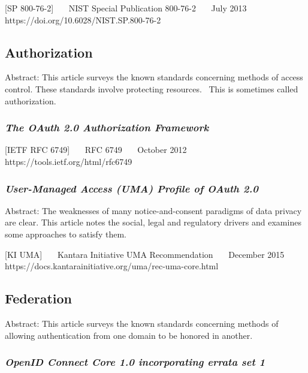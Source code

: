 {[}SP 800-76-2{]}~~~ NIST Special Publication 800-76-2~~~ July 2013~~~
https://doi.org/10.6028/NIST.SP.800-76-2~~~

\hypertarget{authorization-1}{%
\subsection{Authorization}\label{authorization-1}}

Abstract: This article surveys the known standards concerning methods of
access control. These standards involve protecting resources.~ This is
sometimes called authorization.

\hypertarget{the-oauth-2.0-authorization-framework}{%
\subsubsection{\texorpdfstring{\emph{The OAuth 2.0 Authorization
Framework}}{The OAuth 2.0 Authorization Framework}}\label{the-oauth-2.0-authorization-framework}}

{[}IETF RFC 6749{]}~~~ RFC 6749~~~ October 2012~~~
https://tools.ietf.org/html/rfc6749~~~

\hypertarget{user-managed-access-uma-profile-of-oauth-2.0}{%
\subsubsection{\texorpdfstring{\emph{User-Managed Access (UMA) Profile of
OAuth
2.0}}{User-Managed Access (UMA) Profile of OAuth 2.0}}\label{user-managed-access-uma-profile-of-oauth-2.0}}

Abstract: The weaknesses of many notice-and-consent paradigms of data
privacy are clear. This article notes the social, legal and regulatory
drivers and examines some approaches to satisfy them.

{[}KI UMA{]}~~~ Kantara Initiative UMA Recommendation~~~ December
2015~~~ https://docs.kantarainitiative.org/uma/rec-uma-core.html~~~

\hypertarget{federation}{%
\subsection{Federation}\label{federation}}

Abstract: This article surveys the known standards concerning methods of
allowing authentication from one domain to be honored in another.

\hypertarget{openid-connect-core-1.0-incorporating-errata-set-1-1}{%
\subsubsection{\texorpdfstring{\emph{OpenID Connect Core 1.0 incorporating
errata set
1}}{OpenID Connect Core 1.0 incorporating errata set 1}}\label{openid-connect-core-1.0-incorporating-errata-set-1-1}}

